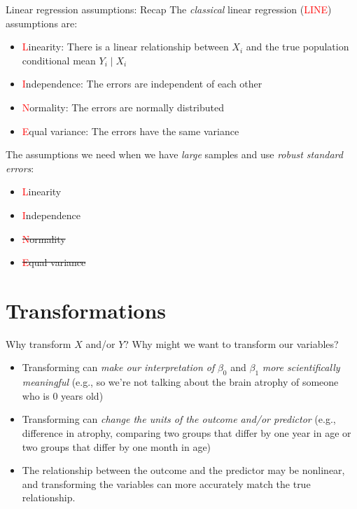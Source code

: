 \documentclass[10pt,t]{beamer}
\begin{document}
\begin{frame}{Linear regression assumptions: Recap}
The \textit{classical} linear regression (\textcolor{red}{LINE}) assumptions are:

\vspace{0.3cm}

\begin{itemize}
	\item \textcolor{red}{L}inearity: There is a linear relationship between $X_i$ and the true population conditional mean $Y_i \mid X_i$
	\item \textcolor{red}{I}ndependence: The errors are independent of each other
	\item \textcolor{red}{N}ormality: The errors are normally distributed
	\item \textcolor{red}{E}qual variance: The errors have the same variance
\end{itemize}

\vspace{0.3cm}

The assumptions we need when we have \textit{large} samples and use \textit{robust standard errors}:

\vspace{0.3cm}

\begin{itemize}
	\item \textcolor{red}{L}inearity
	\item \textcolor{red}{I}ndependence
	\item \sout{\textcolor{red}{N}ormality}
	\item \sout{\textcolor{red}{E}qual variance}
\end{itemize}

\end{frame}


\section{Transformations}

\begin{frame}{Why transform $X$ and/or $Y$?}
	Why might we want to transform our variables?
	\medskip
	
	\begin{itemize}
		\item Transforming can \textit{make our interpretation of} $\beta_0$ and $\beta_1$ \textit{more scientifically meaningful} (e.g., so we're not talking about the brain atrophy of someone who is 0 years old)
		\medskip
		\item Transforming can \textit{change the units of the outcome and/or predictor} (e.g., difference in atrophy, comparing two groups that differ by one year in age or two groups that differ by one month in age)
		\medskip
		\item The relationship between the outcome and the predictor may be nonlinear, and transforming the variables can more accurately match the true relationship.
	\end{itemize}
\end{frame}
\end{document}
